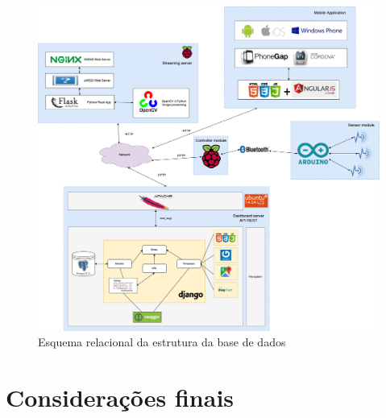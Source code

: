 \begin{figure}[!htb]
	\centering
	\includegraphics[width=\linewidth]{esquemas/arquitetura-final.pdf}
	\caption{Esquema relacional da estrutura da base de dados}
	\label{componentesall}
\end{figure}








\newpage








\section{Considerações finais}
